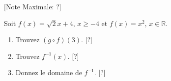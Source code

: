 \begin{question}
  \hspace*{\fill} [Note Maximale: ?]\par
  \medskip
  \noindent Soit $f(x) = \sqrt{2}{x + 4}$, $ x \ge - 4$ et $f(x) = x^2$, $x \in \mathbb{R}$.\par
  \begin{enumerate}[label=(\alph*)]
    \item Trouvez $(g \circ f)(3)$.\hspace*{\fill} [?]
    \item Trouvez $f^{-1}(x)$.\hspace*{\fill} [?]
    \item Donnez le domaine de $f^{-1}$.\hspace*{\fill} [?]
  \end{enumerate}
\end{question}
